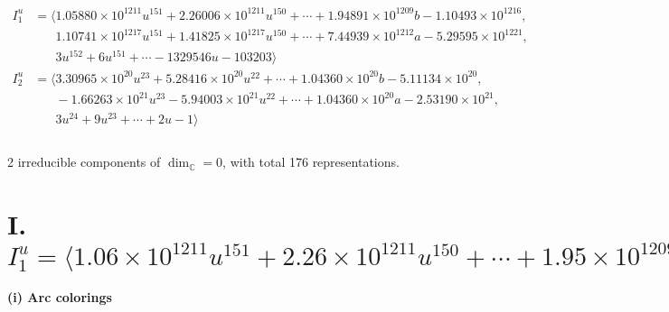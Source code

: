 \documentclass[1p]{elsarticle_modified}
\theoremstyle{definition}
\begin{document}
\begin{align*}
I^u_{1}&=\langle 
1.05880\times10^{1211} u^{151}+2.26006\times10^{1211} u^{150}+\cdots+1.94891\times10^{1209} b-1.10493\times10^{1216},\\
\phantom{I^u_{1}}&\phantom{= \langle  }1.10741\times10^{1217} u^{151}+1.41825\times10^{1217} u^{150}+\cdots+7.44939\times10^{1212} a-5.29595\times10^{1221},\\
\phantom{I^u_{1}}&\phantom{= \langle  }3 u^{152}+6 u^{151}+\cdots-1329546 u-103203\rangle \\
I^u_{2}&=\langle 
3.30965\times10^{20} u^{23}+5.28416\times10^{20} u^{22}+\cdots+1.04360\times10^{20} b-5.11134\times10^{20},\\
\phantom{I^u_{2}}&\phantom{= \langle  }-1.66263\times10^{21} u^{23}-5.94003\times10^{21} u^{22}+\cdots+1.04360\times10^{20} a-2.53190\times10^{21},\\
\phantom{I^u_{2}}&\phantom{= \langle  }3 u^{24}+9 u^{23}+\cdots+2 u-1\rangle \\
\\
\end{align*}
\raggedright * 2 irreducible components of $\dim_{\mathbb{C}}=0$, with total 176 representations.\\
\newpage
\renewcommand{\arraystretch}{1}
\centering \section*{I. $I^u_{1}= \langle 1.06\times10^{1211} u^{151}+2.26\times10^{1211} u^{150}+\cdots+1.95\times10^{1209} b-1.10\times10^{1216},\;1.11\times10^{1217} u^{151}+1.42\times10^{1217} u^{150}+\cdots+7.45\times10^{1212} a-5.30\times10^{1221},\;3 u^{152}+6 u^{151}+\cdots-1329546 u-103203 \rangle$}
\flushleft \textbf{(i) Arc colorings}\\
\end{document}
